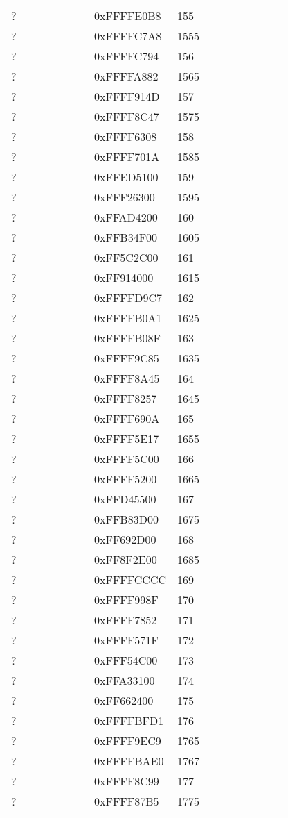 \begin{longtable}{p{0.3\linewidth} p{0.3\linewidth} p{0.4\linewidth}}
? &  0xFFFFE0B8 &  155\\
? &  0xFFFFC7A8 &  1555\\
? &  0xFFFFC794 &  156\\
? &  0xFFFFA882 &  1565\\
? &  0xFFFF914D &  157\\
? &  0xFFFF8C47 &  1575\\
? &  0xFFFF6308 &  158\\
? &  0xFFFF701A &  1585\\
? &  0xFFED5100 &  159\\
? &  0xFFF26300 &  1595\\
? &  0xFFAD4200 &  160\\
? &  0xFFB34F00 &  1605\\
? &  0xFF5C2C00 &  161\\
? &  0xFF914000 &  1615\\
? &  0xFFFFD9C7 &  162\\
? &  0xFFFFB0A1 &  1625\\
? &  0xFFFFB08F &  163\\
? &  0xFFFF9C85 &  1635\\
? &  0xFFFF8A45 &  164\\
? &  0xFFFF8257 &  1645\\
? &  0xFFFF690A &  165\\
? &  0xFFFF5E17 &  1655\\
? &  0xFFFF5C00 &  166\\
? &  0xFFFF5200 &  1665\\
? &  0xFFD45500 &  167\\
? &  0xFFB83D00 &  1675\\
? &  0xFF692D00 &  168\\
? &  0xFF8F2E00 &  1685\\
? &  0xFFFFCCCC &  169\\
? &  0xFFFF998F &  170\\
? &  0xFFFF7852 &  171\\
? &  0xFFFF571F &  172\\
? &  0xFFF54C00 &  173\\
? &  0xFFA33100 &  174\\
? &  0xFF662400 &  175\\
? &  0xFFFFBFD1 &  176\\
? &  0xFFFF9EC9 &  1765\\
? &  0xFFFFBAE0 &  1767\\
? &  0xFFFF8C99 &  177\\
? &  0xFFFF87B5 &  1775\\

\end{longtable}
